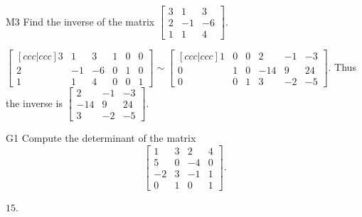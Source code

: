 \documentclass{sbgLAexam}
\begin{document}
\begin{extract}\newpage\end{extract}
\begin{problem}{M3}
  Find the inverse of the matrix
  \(\begin{bmatrix}
    3 & 1 & 3  \\
    2 & -1 & -6  \\
    1 & 1 & 4
  \end{bmatrix}\).
\end{problem}
\begin{solution}
\(\begin{bmatrix}[ccc|ccc]
  3 & 1 & 3 & 1 & 0 & 0 \\
  2 & -1 & -6 & 0 & 1 & 0 \\
  1 & 1 & 4 & 0 & 0 & 1
\end{bmatrix}\sim\begin{bmatrix}[ccc|ccc]
  1 & 0 & 0 & 2 & -1 & -3  \\
  0 & 1 & 0 & -14 & 9 & 24  \\
  0 & 0 & 1 & 3 & -2 & -5
\end{bmatrix}\). Thus the inverse is
\(\begin{bmatrix}
  2 & -1 & -3  \\
  -14 & 9 & 24  \\
  3 & -2 & -5
\end{bmatrix}\).
\end{solution}


\begin{problem}{G1}
Compute the determinant of the matrix
\[
  \begin{bmatrix}
    1 & 3 & 2 & 4 \\
    5 & 0 & -4 & 0 \\
    -2 & 3 & -1 & 1 \\
    0 & 1 & 0 & 1
  \end{bmatrix}
.\]
\end{problem}
\begin{solution}
\(15\).
\end{solution}
\end{document}
